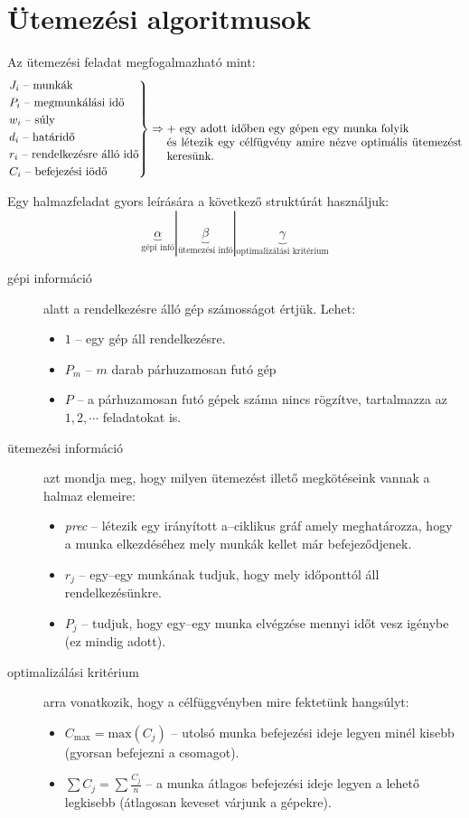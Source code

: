 \skiptooddpage 
\section{Ütemezési algoritmusok}

Az ütemezési feladat megfogalmazható mint:
\[
\begin{rcases}
J_i \mbox{ -- munkák} \\
P_i \mbox{ -- megmunkálási idő} \\
w_i \mbox{ -- súly} \\
d_i \mbox{ -- határidő} \\
r_i \mbox{ -- rendelkezésre álló idő} \\
C_i \mbox{ -- befejezési iödő} \\
\end{rcases}
\Rightarrow 
\parbox[t]{9cm}{ $+$ egy adott időben egy gépen egy munka folyik \\
és létezik egy célfügvény amire nézve optimális ütemezést keresünk.}
\]

Egy halmazfeladat gyors leírására a következő struktúrát használjuk:
\[
\underbrace{\alpha}_{\mbox{gépi infó}} | \underbrace{\beta}_{\mbox{ütemezési infó}
} | \underbrace{\gamma}_{\mbox{optimalizálási kritérium}}
\]

\begin{description}
  \item[gépi információ] alatt a rendelkezésre álló gép számosságot értjük. Lehet:
  \begin{itemize}
  \item $1$ -- egy gép áll rendelkezésre.
  \item $P_m$ -- $m$ darab párhuzamosan futó gép
  \item $P$ -- a párhuzamosan futó gépek száma nincs rögzítve, tartalmazza az $1,2,\cdots$ feladatokat is.
\end{itemize}
  \item[ütemezési információ] azt mondja meg, hogy milyen ütemezést illető
  megkötéseink vannak a halmaz elemeire:
  \begin{itemize}
  \item \emph{prec} -- létezik egy irányított a--ciklikus gráf amely
  meghatározza, hogy a munka elkezdéséhez mely munkák kellet már befejeződjenek.
  \item $r_j$ -- egy--egy munkának tudjuk, hogy mely időponttól áll rendelkezésünkre.
  \item $P_j$ -- tudjuk, hogy egy--egy munka elvégzése mennyi időt vesz igénybe
  (ez mindig adott).
\end{itemize}
  \item[optimalizálási kritérium] arra vonatkozik, hogy a célfüggvényben mire
  fektetünk hangsúlyt:
  \begin{itemize}
  \item $C_{\mbox{max}}=\mbox{max}(C_j)$ -- utolsó munka befejezési ideje legyen minél
  kisebb (gyorsan befejezni a csomagot).
  \item $\sum C_j = \sum \frac{C_j}{n}$ -- a munka átlagos befejezési ideje
  legyen a lehető legkisebb (átlagosan keveset várjunk a gépekre).
\end{itemize}
\end{description} 

